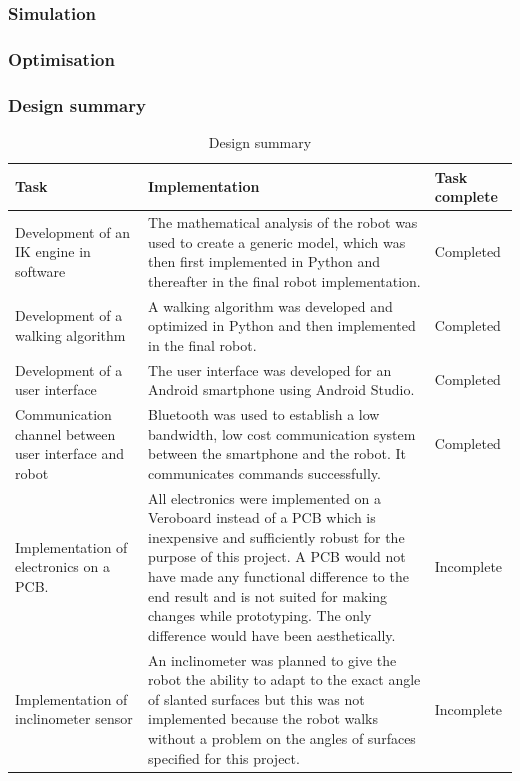 \subsubsection{Simulation}


\subsubsection{Optimisation}




\captionsetup[table]{position=bottom}



\subsubsection{Design summary}
\begin{table}[H]
\centering

\begin{tabular}{|p{5cm}|p{5cm}|p{5cm}|}
\hline
\textbf{Task} & \textbf{Implementation} & \textbf{Task complete} \\
\hline
 Development of an IK engine in software & The mathematical analysis of the robot was used to create a generic model, which was then first implemented in Python and thereafter in the final robot implementation. & Completed \\\hline
 
Development of a walking algorithm  & A walking algorithm was developed and optimized in Python and then implemented in the final robot.  & Completed\\\hline

Development of a user interface & The user interface was developed for an Android smartphone using Android Studio. & Completed \\\hline

Communication channel between user interface and robot & Bluetooth was used to establish a low bandwidth, low cost communication system between the smartphone and the robot. It communicates commands successfully. & Completed \\\hline

Implementation of electronics on a PCB.& All electronics were implemented on a Veroboard instead of a PCB which is inexpensive and sufficiently robust for the purpose of this project. A PCB would not have made any functional difference to the end result and is not suited for making changes while prototyping. The only difference would have been aesthetically.& Incomplete \\\hline

Implementation of inclinometer sensor & An inclinometer was planned to give the robot the ability to adapt to the exact angle of slanted surfaces but this was not implemented because the robot walks without a problem on the angles of surfaces specified for this project. & Incomplete \\\hline
\end{tabular}
\caption{Design summary}
\label{my-label}
\end{table}


